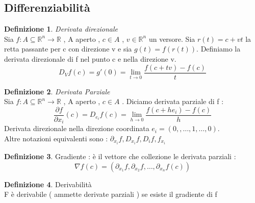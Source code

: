 \documentclass{article}
\theoremstyle{definition}
\newtheorem*{definizione}{Definizione}
\newcommand{\R}{\mathbb{R}}
\newcommand{\Rn}{\R^n}
\newcommand{\fn}{f: A\subseteq \Rn \rightarrow \R}
\begin{document}
	\subsection{Differenziabilità}
	\begin{definizione}
		\textit{Derivata direzionale}\\
		Sia $\fn$ , A aperto , $c \in A$ , $v \in \Rn$ un versore. Sia $r(t)=c+vt$ la retta passante per c con direzione v e sia $g(t)=f(r(t))$. Definiamo la derivata direzionale di f nel punto c e nella direzione v.
		$$D_Vf(c)=g'(0)=\lim_{t\rightarrow 0} \frac{f(c+tv)-f(c)}{t}$$
	\end{definizione}
	\begin{definizione}
		\textit{ Derivata Parziale}\\
		Sia $\fn$ , A aperto , $c \in A$ . Diciamo derivata parziale di f : $$\frac{\partial f}{\partial x_i}(c)=D_{e_i}f(c)=\lim_{h\rightarrow 0}\frac{f(c+he_i)-f(c)}{h}$$
		Derivata direzionale nella direzione coordinata $e_i=(0 ,, \dots , 1 , \dots , 0)$. \\
		Altre notazioni equivalenti sono : $\partial_{x_i}f,D_{x_i}f,D_i f , f_{x_i}$
	\end{definizione}
	\begin{definizione}
		Gradiente : 
		è il vettore che collezione le derivata parziali : 
		$$\nabla f(c)=(\partial_{x_1} f , \partial_{x_2}f,\dots,\partial_{x_n}f(c))$$
	\end{definizione}
	\begin{definizione}
		Derivabilità \\
		F è derivabile ( ammette derivate parziali ) se esiste il gradiente di f 
	\end{definizione}
	
\end{document}

